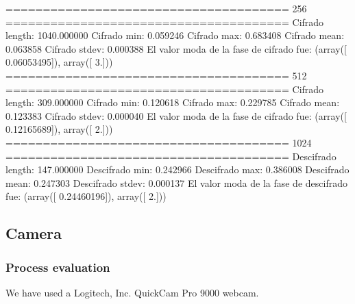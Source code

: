 \documentclass[journal,twoside]{JoPhA}
\begin{document}



% 
% 
======================================
256
======================================
Cifrado length: 1040.000000
Cifrado min: 0.059246
Cifrado max: 0.683408
Cifrado mean: 0.063858
Cifrado stdev: 0.000388
El valor moda de la fase de cifrado fue:
(array([ 0.06053495]), array([ 3.]))
======================================
512
======================================
Cifrado length: 309.000000
Cifrado min: 0.120618
Cifrado max: 0.229785
Cifrado mean: 0.123383
Cifrado stdev: 0.000040
El valor moda de la fase de cifrado fue:
(array([ 0.12165689]), array([ 2.]))
======================================
1024
======================================
Descifrado length: 147.000000
Descifrado min: 0.242966
Descifrado max: 0.386008
Descifrado mean: 0.247303
Descifrado stdev: 0.000137
El valor moda de la fase de descifrado fue:
(array([ 0.24460196]), array([ 2.]))





\subsection{Camera}

\subsubsection{Process evaluation}

We have used a Logitech, Inc. QuickCam Pro 9000 webcam.
\end{document}
